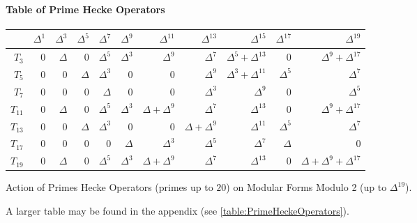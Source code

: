 \paragraph{Table of Prime Hecke Operators}
\begin{center}
	\begin{tabular}{|r|rrrrrrrrrr|}
		\hline
		\textbf{} & \textbf{$\Delta^1$} & \textbf{$\Delta^3$} & \textbf{$\Delta^5$} & \textbf{$\Delta^7$} & \textbf{$\Delta^9$} & \textbf{$\Delta^{11}$} & \textbf{$\Delta^{13}$} & \textbf{$\Delta^{15}$} & \textbf{$\Delta^{17}$} & \textbf{$\Delta^{19}$} \\
		\hline
		$T_3$ & 0 & $\Delta$ & 0 & $\Delta^5$ & $\Delta^3$ & $\Delta^9$ & $\Delta^7$ & $\Delta^5 + \Delta^{13}$ & 0 & $\Delta^9 + \Delta^{17}$ \\       
		$T_5$ & 0 & 0 & $\Delta$ & $\Delta^3$ & 0 & 0 & $\Delta^9$ & $\Delta^3 + \Delta^{11}$ & $\Delta^5$ & $\Delta^7$ \\
		$T_7$ & 0 & 0 & 0 & $\Delta$ & 0 & 0 & $\Delta^3$ & $\Delta^9$ & 0 & $\Delta^5$ \\
		$T_{11}$ & 0 & $\Delta$ & 0 & $\Delta^5$ & $\Delta^3$ & $\Delta + \Delta^9$ & $\Delta^7$ & $\Delta^{13}$ & 0 & $\Delta^9 + \Delta^{17}$ \\
		$T_{13}$ & 0 & 0 & $\Delta$ & $\Delta^3$ & 0 & 0 & $\Delta + \Delta^9$ & $\Delta^{11}$ & $\Delta^5$ & $\Delta^7$ \\
		$T_{17}$ & 0 & 0 & 0 & 0 & $\Delta$ & $\Delta^3$ & $\Delta^5$ & $\Delta^7$ & $\Delta$ & 0 \\
		$T_{19}$ & 0 & $\Delta$ & 0 & $\Delta^5$ & $\Delta^3$ & $\Delta + \Delta^9$ & $\Delta^7$ & $\Delta^{13}$ & 0 & $\Delta + \Delta^9 + \Delta^{17}$ \\
		\hline
	\end{tabular}
	
	Action of Primes Hecke Operators (primes up to $20$) on Modular Forms Modulo 2 (up to $\Delta^{19}$).
\end{center}
A larger table may be found in the appendix (see \ref{table:PrimeHeckeOperators}).

